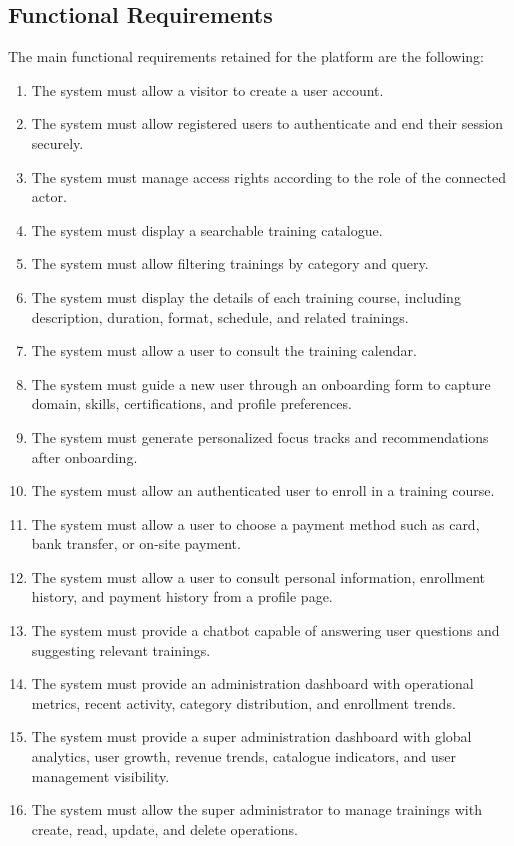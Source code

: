 \subsection{Functional Requirements}
The main functional requirements retained for the platform are the following:

\begin{enumerate}
\item The system must allow a visitor to create a user account.
\item The system must allow registered users to authenticate and end their session securely.
\item The system must manage access rights according to the role of the connected actor.
\item The system must display a searchable training catalogue.
\item The system must allow filtering trainings by category and query.
\item The system must display the details of each training course, including description, duration, format, schedule, and related trainings.
\item The system must allow a user to consult the training calendar.
\item The system must guide a new user through an onboarding form to capture domain, skills, certifications, and profile preferences.
\item The system must generate personalized focus tracks and recommendations after onboarding.
\item The system must allow an authenticated user to enroll in a training course.
\item The system must allow a user to choose a payment method such as card, bank transfer, or on-site payment.
\item The system must allow a user to consult personal information, enrollment history, and payment history from a profile page.
\item The system must provide a chatbot capable of answering user questions and suggesting relevant trainings.
\item The system must provide an administration dashboard with operational metrics, recent activity, category distribution, and enrollment trends.
\item The system must provide a super administration dashboard with global analytics, user growth, revenue trends, catalogue indicators, and user management visibility.
\item The system must allow the super administrator to manage trainings with create, read, update, and delete operations.

\end{enumerate}
